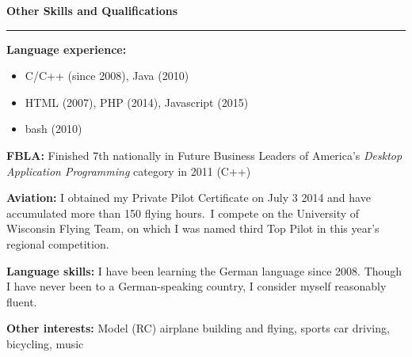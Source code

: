 \documentclass[12pt,letterpaper]{article}
\newenvironment{details}{
    \vspace{-.5em}
    \begin{itemize}
        \renewcommand \labelitemi{\labelitemiv}
        \setlength{\itemsep}{0pt}
        \setlength{\parskip}{-1pt}
        \setlength{\parsep}{0pt}
    }{
    \end{itemize}
    \vspace{-.5em}
}
\newcommand{\hr} {
    \vspace{-1em}
    \par\rule{\textwidth}{1pt}
    \vspace{-1.5em}
}
\newcommand{\ressection}[1] {
    \par{\large \textbf{#1}}
    \hr
}
\newenvironment{other} {
    \ressection{Other Skills and Qualifications}
    \setlength{\parskip}{3pt}
}{
    \vspace{0.5em}
}
\begin{document}
\begin{other}
\par \textbf{Language experience:}
\vspace{-.5em}
\begin{details}
    \item C/C++ (since 2008), Java (2010)
    \item HTML (2007), PHP (2014), Javascript (2015)
    \item bash (2010)
\end{details}
\par \textbf{FBLA:} Finished 7th nationally in Future Business Leaders of America's \textit{Desktop Application Programming} category in 2011 (C++)

\par \textbf{Aviation:} I obtained my Private Pilot Certificate on July 3 2014 and have accumulated more than 150 flying hours.~I compete on the University of Wisconsin Flying Team, on which I was named third Top Pilot in this year's regional competition.

\par \textbf{Language skills:} I have been learning the German language since 2008.  Though I have never been to a German-speaking country, I consider myself reasonably fluent.

\par \textbf{Other interests:} Model (RC) airplane building and flying, sports car driving, bicycling, music

\end{other}
\end{document}
